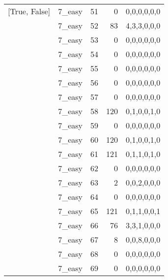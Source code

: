 \begin{tabular}{llrrl}
 [True, False]   & 7\_easy              &            51 &                     0 & 0,0,0,0,0,0   \\
 [True, False]   & 7\_easy              &            52 &                    83 & 4,3,3,0,0,0   \\
 [True, False]   & 7\_easy              &            53 &                     0 & 0,0,0,0,0,0   \\
 [True, False]   & 7\_easy              &            54 &                     0 & 0,0,0,0,0,0   \\
 [True, False]   & 7\_easy              &            55 &                     0 & 0,0,0,0,0,0   \\
 [True, False]   & 7\_easy              &            56 &                     0 & 0,0,0,0,0,0   \\
 [True, False]   & 7\_easy              &            57 &                     0 & 0,0,0,0,0,0   \\
 [True, False]   & 7\_easy              &            58 &                   120 & 0,1,0,0,1,0   \\
 [True, False]   & 7\_easy              &            59 &                     0 & 0,0,0,0,0,0   \\
 [True, False]   & 7\_easy              &            60 &                   120 & 0,1,0,0,1,0   \\
 [True, False]   & 7\_easy              &            61 &                   121 & 0,1,1,0,1,0   \\
 [True, False]   & 7\_easy              &            62 &                     0 & 0,0,0,0,0,0   \\
 [True, False]   & 7\_easy              &            63 &                     2 & 0,0,2,0,0,0   \\
 [True, False]   & 7\_easy              &            64 &                     0 & 0,0,0,0,0,0   \\
 [True, False]   & 7\_easy              &            65 &                   121 & 0,1,1,0,0,1   \\
 [True, False]   & 7\_easy              &            66 &                    76 & 3,3,1,0,0,0   \\
 [True, False]   & 7\_easy              &            67 &                     8 & 0,0,8,0,0,0   \\
 [True, False]   & 7\_easy              &            68 &                     0 & 0,0,0,0,0,0   \\
 [True, False]   & 7\_easy              &            69 &                     0 & 0,0,0,0,0,0   \\

\end{tabular}
